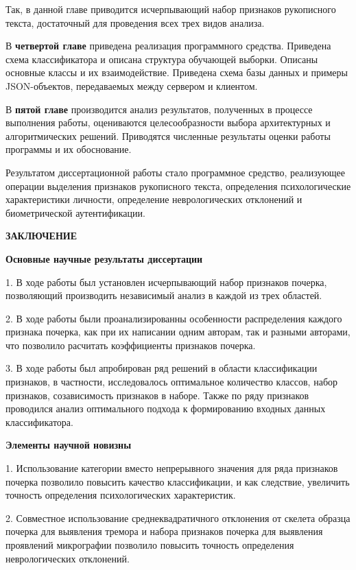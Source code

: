 Так, в данной главе приводится исчерпывающий набор признаков рукописного текста, достаточный для проведения всех трех видов анализа.

В \textbf{четвертой главе} приведена реализация программного средства. Приведена схема классификатора и описана структура обучающей выборки. Описаны основные классы и их взаимодействие. Приведена схема базы данных и примеры JSON-объектов, передаваемых между сервером и клиентом.

В \textbf{пятой главе} производится анализ результатов, полученных в процессе выполнения работы, оцениваются целесообразности выбора архитектурных и алгоритмических решений. Приводятся численные результаты оценки работы программы и их обоснование.

Результатом диссертационной работы стало программное средство, реализующее операции выделения признаков рукописного текста, определения психологические характеристики личности, определение неврологических отклонений и биометрической аутентификации.

\clearpage

\begin{center}
{\bfseries ЗАКЛЮЧЕНИЕ}
\end{center}

\textbf{Основные научные результаты диссертации}
\bigskip

1. В ходе работы был установлен исчерпывающий набор признаков почерка, позволяющий производить независимый анализ в каждой из трех областей.

2. В ходе работы были проанализированны особенности распределения каждого признака почерка, как при их написании одним авторам, так и разными авторами, что позволило расчитать коэффициенты признаков почерка.

3. В ходе работы был апробирован ряд решений в области классификации признаков, в частности, исследовалось оптимальное количество классов, набор признаков, созависимость признаков в наборе. Также по ряду признаков проводился анализ оптимального подхода к формированию входных данных классификатора.

\bigskip
\textbf{Элементы научной новизны}
\bigskip

1. Использование категории вместо непрерывного значения для ряда признаков почерка позволило повысить качество классификации, и как следствие, увеличить точность определения психологических характеристик.

2. Совместное использование среднеквадратичного отклонения от скелета образца почерка для выявления тремора и набора признаков почерка для выявления проявлений микрографии позволило повысить точность определения неврологических отклонений.

